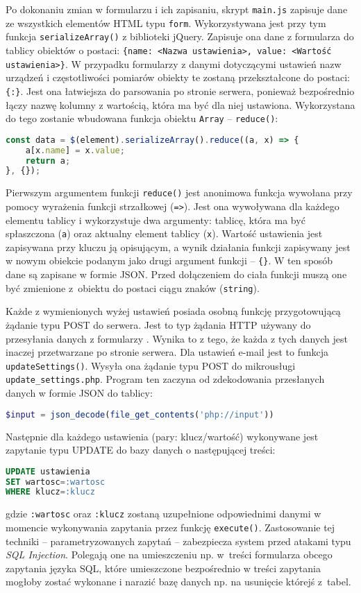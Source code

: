 \documentclass[a4paper,11pt,twoside]{article}
\begin{document}
Po dokonaniu zmian w formularzu i ich zapisaniu, skrypt \texttt{main.js} zapisuje dane ze wszystkich elementów HTML typu \texttt{form}. Wykorzystywana jest przy tym funkcja \linebreak \texttt{serializeArray()} z biblioteki jQuery. Zapisuje ona dane z formularza do tablicy obiektów o postaci: \texttt{\{name: <Nazwa ustawienia>, value: <Wartość ustawienia>\}}. W przypadku formularzy z danymi dotyczącymi ustawień nazw urządzeń i częstotliwości pomiarów obiekty te zostaną przekształcone do postaci: \texttt{\{<Nazwa ustawienia>:\}}. Jest ona łatwiejsza do parsowania po stronie serwera, ponieważ bezpośrednio łączy nazwę kolumny z wartością, która ma być dla niej ustawiona. Wykorzystana do tego zostanie wbudowana funkcja obiektu \texttt{Array} -- \texttt{reduce()}:
\begin{lstlisting}[language=JavaScript]
const data = $(element).serializeArray().reduce((a, x) => {
	a[x.name] = x.value;
	return a;
}, {});
\end{lstlisting}
Pierwszym argumentem funkcji \texttt{reduce()} jest anonimowa funkcja wywołana przy pomocy wyrażenia funkcji strzałkowej (\texttt{=>}). Jest ona wywoływana dla każdego elementu tablicy i wykorzystuje dwa argumenty: tablicę, która ma być spłaszczona (\texttt{a}) oraz aktualny element tablicy (\texttt{x}). Wartość ustawienia jest zapisywana przy kluczu ją opisującym, a wynik działania funkcji zapisywany jest w nowym obiekcie podanym jako drugi argument funkcji -- \texttt{\{\}}. W ten sposób dane są zapisane w formie JSON. Przed dołączeniem do ciała funkcji muszą one być zmienione z~obiektu do postaci ciągu znaków (\texttt{string}).

Każde z wymienionych wyżej ustawień posiada osobną funkcję przygotowującą żądanie typu POST do serwera. Jest to typ żądania HTTP używany do przesyłania danych z formularzy \cite{http}. Wynika to z tego, że każda z tych danych jest inaczej przetwarzane po stronie serwera. Dla ustawień e-mail jest to funkcja \texttt{updateSettings()}. Wysyła ona żądanie typu POST do mikrousługi \texttt{update{\_}settings.php}. Program ten zaczyna od zdekodowania przesłanych danych w formie JSON do tablicy:
\begin{lstlisting}[language=PHP]
$input = json_decode(file_get_contents('php://input'))
\end{lstlisting}
Następnie dla każdego ustawienia (pary: klucz/wartość) wykonywane jest zapytanie typu UPDATE do bazy danych o następującej treści:
\begin{lstlisting}[language=SQL]
UPDATE ustawienia 
SET wartosc=:wartosc
WHERE klucz=:klucz
\end{lstlisting}
gdzie \texttt{:wartosc} oraz \texttt{:klucz} zostaną uzupełnione odpowiednimi danymi w momencie wykonywania zapytania przez funkcję \texttt{execute()}. Zastosowanie tej techniki -- parametryzowanych zapytań -- zabezpiecza system przed atakami typu \textit{SQL Injection}. Polegają one na umieszczeniu np. w~treści formularza obcego zapytania języka SQL, które umieszczone bezpośrednio w treści zapytania mogłoby zostać wykonane i narazić bazę danych np. na usunięcie którejś z~tabel.\cite{sql-injection}
\end{document}
